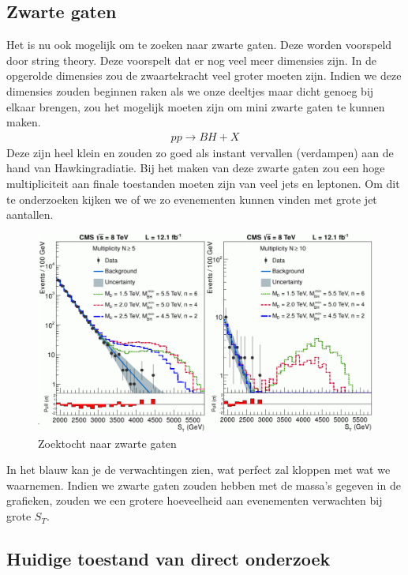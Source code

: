 \documentclass[../main.tex]{subfiles}
\begin{document}
\subsection{Zwarte gaten}%
\label{sub:zwarte_gaten}

Het is nu ook mogelijk om te zoeken naar zwarte gaten. Deze worden voorspeld door string theory. Deze voorspelt dat er nog veel meer dimensies zijn. In de opgerolde dimensies zou de zwaartekracht veel groter moeten zijn. Indien we deze dimensies zouden beginnen raken als we onze deeltjes maar dicht genoeg bij elkaar brengen, zou het mogelijk moeten zijn om mini zwarte gaten te kunnen maken.
\begin{equation}
    \begin{aligned}
        \label{eq:zwarte_gaten}
        p p \rightarrow B H+X
    \end{aligned}
\end{equation}
Deze zijn heel klein en zouden zo goed als instant vervallen (verdampen) aan de hand van Hawkingradiatie. Bij het maken van deze zwarte gaten zou een hoge multipliciteit aan finale toestanden moeten zijn van veel jets en leptonen. Om dit te onderzoeken kijken we of we zo evenementen kunnen vinden met grote jet aantallen.
\begin{figure}[h]
    \centering
    \includegraphics[width=0.6\linewidth]{physics_beyond_the_standard_model/zwarte_gaten.png}
    \caption{Zoektocht naar zwarte gaten}%
    \label{fig:physics_}
\end{figure}

In het blauw kan je de verwachtingen zien, wat perfect zal kloppen met wat we waarnemen. Indien we zwarte gaten zouden hebben met de massa's gegeven in de grafieken, zouden we een grotere hoeveelheid aan evenementen verwachten bij grote $S_T$.

\subsection{Huidige toestand van direct onderzoek}%
\label{sub:huidige_toestand_van_direct_onderzoek}
\end{document}
